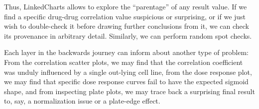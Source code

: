 \documentclass[twocolumn,10pt]{article}
\begin{document}
Thus, LinkedCharts allows to explore the ``parentage'' of any result value. If we find a specific drug-drug correlation value suspicious or surprising, or if we just wish to double-check it before drawing further conclusions from it, we can check its provenance in arbitrary detail. Similarly, we can perform random spot checks. 

Each layer in the backwards journey can inform about another type of problem: From the correlation scatter plots, we may find that the correlation coefficient was unduly influenced by a single out-lying cell line, from the dose response plot, we may find that specific dose response curves fail to have the expected sigmoid shape, and from inspecting plate plots, we may trace back a surprising final result to, say, a normalization issue or a plate-edge effect.
\end{document}

